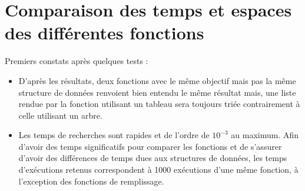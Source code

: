 \documentclass[a4paper,12pt]{article}
\begin{document}
\section{Comparaison des temps et espaces des différentes fonctions}
Premiers constats après quelques tests :
\begin{itemize}
\item D'après les résultats, deux fonctions avec le même objectif mais pas la même structure de données renvoient bien entendu le même résultat mais, une liste rendue par la fonction utilisant un tableau sera toujours triée contrairement à celle utilisant un arbre.
\item Les temps de recherches sont rapides et de l'ordre de $10^{-3}$ au maximum. Afin d'avoir des temps significatifs pour comparer les fonctions et de s'assurer d'avoir des différences de temps dues aux structures de données, les temps d'exécutions retenus correspondent à 1000 exécutions d'une même fonction, à l'exception des fonctions de remplissage.\\
\end{itemize}
\end{document}
